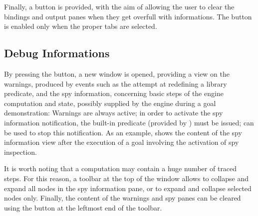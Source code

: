 Finally, a  button is provided, with the aim of allowing the user to clear the bindings and output panes when they get overfull with informations.
%
The button is enabled only when the proper tabs are selected.

\subsection{Debug Informations}

By pressing the  button, a new window is opened, providing a view on the warnings, produced by events such as the attempt at redefining a library predicate, and the spy information, concerning basic steps of the engine computation and state, possibly supplied by the engine during a goal demonstration:
%
Warnings are always active;
%
in order to activate the spy information notification, the  built-in predicate (provided by ) must be issued;
%
 can be used to stop this notification.
%
As an example,  shows the content of the spy information view after the
execution of a goal involving the activation of spy inspection.

It is worth noting that a computation may contain a huge number of traced steps.
%
For this reason, a toolbar at the top of the window allows to collapse and expand all nodes in the spy information pane, or to expand and collapse selected nodes only.
%
Finally, the content of the warnings and spy panes can be cleared using the  button at the leftmost end of the toolbar.


